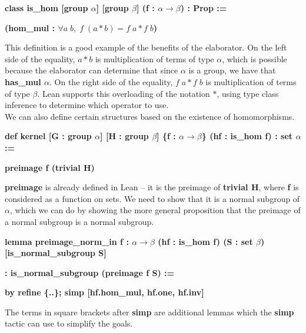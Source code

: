 \documentclass[runningheads,a4paper]{llncs}
\renewcommand{\a}{\alpha}
\renewcommand{\b}{\beta}
\renewcommand{\-}{\setminus}
\begin{document}
\vspace{2 mm}
\hspace{2 em}\textbf{class is\_hom [group $\a$] [group $\b$] (f : $\a \to \b$) : Prop :=}

\hspace{4 em}\textbf{(hom\_mul : $\forall a\; b,\; f\; (a * b) = f\; a * f\; b$)}
\vspace{2 mm}

This definition is a good example of the benefits of the elaborator. On the left side of the equality, $a * b$ is multiplication of terms of type $\a$, which is possible because the elaborator can determine that since $\a$ is a group, we have that \textbf{has\_mul $\a$}. On the right side of the equality, $f\; a * f\; b$ is multiplication of terms of type $\b$. Lean supports this overloading of the notation $*$, using type class inference to determine which operator to use.\\

We can also define certain structures based on the existence of homomorphisms.

\vspace{2 mm}
\hspace{2 em}\textbf{def kernel [G : group $\a$] [H : group $\b$] \{f : $\a \to \b$\} (hf : is\_hom f) : set $\a$ :=}

\hspace{4 em}\textbf{preimage f (trivial H)}
\vspace{2 mm}

\textbf{preimage} is already defined in Lean -- it is the preimage of \textbf{trivial H}, where \textbf{f} is considered as a function on sets. We need to show that it is a normal subgroup of $\a$, which we can do by showing the more general proposition that the preimage of a normal subgroup is a normal subgroup.

\vspace{2 mm}
\hspace{0 em}\textbf{lemma preimage\_norm\_in {f : $\a \to \b$} (hf : is\_hom f) (S : set $\b$) [is\_normal\_subgroup S]}

\hspace{2 em}\textbf{: is\_normal\_subgroup (preimage f S) :=}

\hspace{4 em}\textbf{by refine \{..\}; simp [hf.hom\_mul, hf.one, hf.inv]}
\vspace{2 mm}

The terms in square brackets after \textbf{simp} are additional lemmas which the \textbf{simp} tactic can use to simplify the goals.\\
\end{document}
